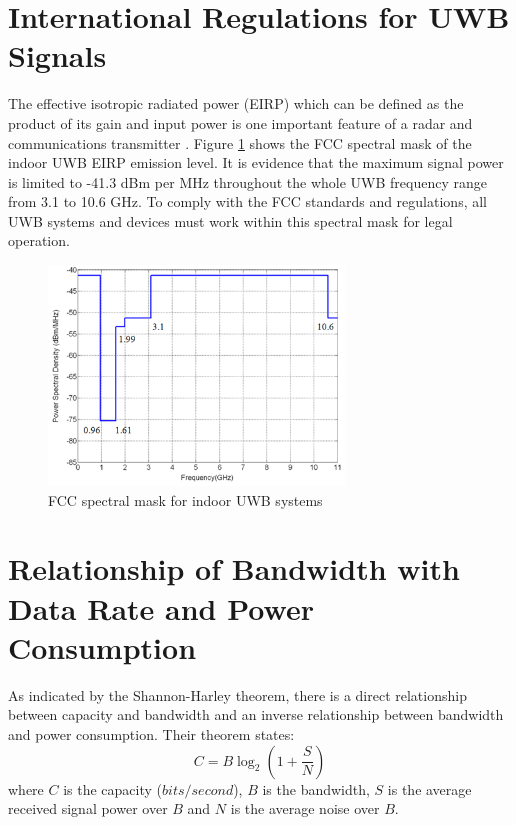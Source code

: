 \documentclass[\main/main.tex]{subfiles}
\begin{document}
\section{International Regulations for UWB Signals}

The effective isotropic radiated power (EIRP) which can be defined as the product of its gain and input power is one important feature of a radar and communications transmitter . Figure \ref{fig:fcc_spectral_mask_for_indoor_uwb_systems} shows the FCC spectral mask of the indoor UWB EIRP emission level. It is evidence that the maximum signal power is limited to -41.3 dBm per MHz throughout the whole UWB frequency range from 3.1 to 10.6 GHz. To comply with the FCC standards and regulations, all UWB systems and devices must work within this spectral mask for legal operation.

\begin{figure}[H]
    \centering
    \includegraphics[width=0.7\textwidth]{fcc_spectral_mask_for_indoor_uwb_systems}
    \caption{FCC spectral mask for indoor UWB systems}
    \label{fig:fcc_spectral_mask_for_indoor_uwb_systems}
\end{figure}

\section{Relationship of Bandwidth with Data Rate and Power Consumption}
As indicated by the Shannon-Harley theorem, there is a direct relationship between capacity and bandwidth and an inverse relationship between bandwidth and power consumption. Their theorem states: 
\begin{equation}
    C=B\log_2(1+\frac{S}{N})
\end{equation} where $C$ is the capacity ($bits/second$), $B$ is the bandwidth, $S$ is the average received signal power over $B$ and $N$ is the average noise over $B$. 
\end{document}
